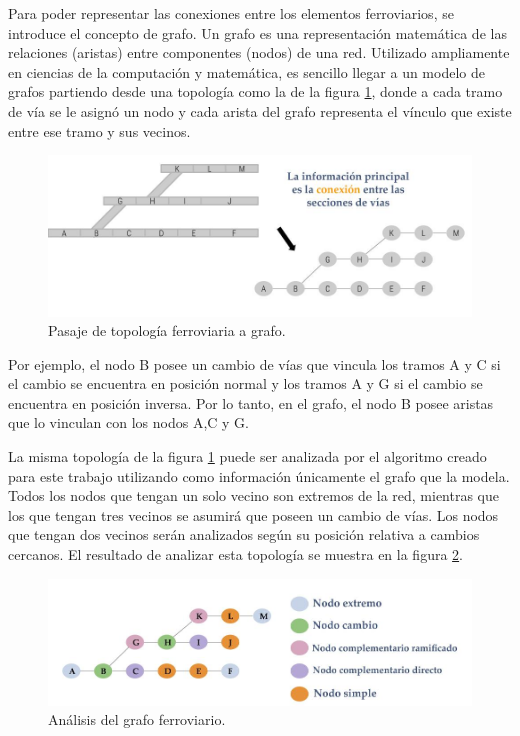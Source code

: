 		Para poder representar las conexiones entre los elementos ferroviarios, se introduce el concepto de grafo. Un grafo es una representación matemática de las relaciones (aristas) entre componentes (nodos) de una red. Utilizado ampliamente en ciencias de la computación y matemática, es sencillo llegar a un modelo de grafos partiendo desde una topología como la de la figura \ref{fig:Topologia_Grafo}, donde a cada tramo de vía se le asignó un nodo y cada arista del grafo representa el vínculo que existe entre ese tramo y sus vecinos.
		
		\begin{figure}[h]
		\centering
			\includegraphics[scale=.4]{./Figures/Topologia_grafo}
			\caption{Pasaje de topología ferroviaria a grafo.}
			\label{fig:Topologia_Grafo}
		\end{figure}
	
		Por ejemplo, el nodo B posee un cambio de vías que vincula los tramos A y C si el cambio se encuentra en posición normal y los tramos A y G si el cambio se encuentra en posición inversa. Por lo tanto, en el grafo, el nodo B posee aristas que lo vinculan con los nodos A,C y G.
		
		La misma topología de la figura \ref{fig:Topologia_Grafo} puede ser analizada por el algoritmo creado para este trabajo utilizando como información únicamente el grafo que la modela. Todos los nodos que tengan un solo vecino son extremos de la red, mientras que los que tengan tres vecinos se asumirá que poseen un cambio de vías. Los nodos que tengan dos vecinos serán analizados según su posición relativa a cambios cercanos. El resultado de analizar esta topología se muestra en la figura \ref{fig:Grafo_Analisis}.
	
		\begin{figure}[h]
		\centering
			\includegraphics[scale=.4]{./Figures/Grafo}
			\caption{Análisis del grafo ferroviario.}
			\label{fig:Grafo_Analisis}
		\end{figure}
	
